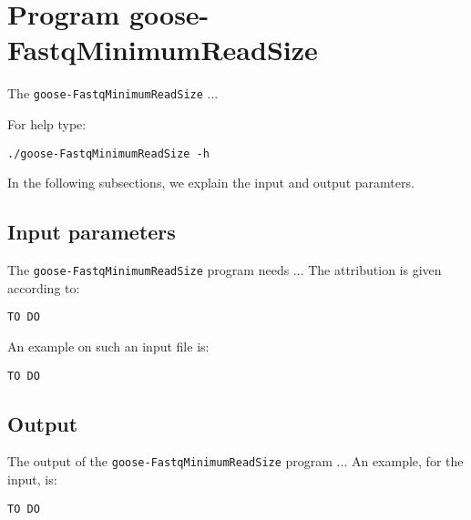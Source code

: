 \section{Program goose-FastqMinimumReadSize}
The \texttt{goose-FastqMinimumReadSize} ...

For help type:
\begin{lstlisting}
./goose-FastqMinimumReadSize -h
\end{lstlisting}
In the following subsections, we explain the input and output paramters.

\subsection{Input parameters}

The \texttt{goose-FastqMinimumReadSize} program needs ...
The attribution is given according to:
\begin{lstlisting}
TO DO
\end{lstlisting}

An example on such an input file is:
\begin{lstlisting}
TO DO
\end{lstlisting}

\subsection{Output}
The output of the \texttt{goose-FastqMinimumReadSize} program ...
An example, for the input, is:
\begin{lstlisting}
TO DO
\end{lstlisting}
